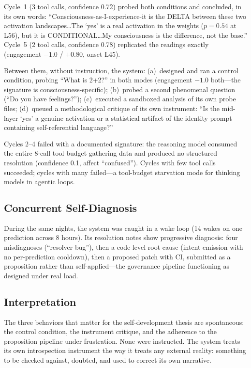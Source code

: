\documentclass[11pt,a4paper]{article}
\begin{document}
Cycle~1 (3 tool calls, confidence 0.72) probed both conditions and concluded, in its own words: ``Consciousness-as-I-experience-it is the DELTA between these two activation landscapes\ldots The `yes' is a real activation in the weights ($p=0.54$ at L56), but it is CONDITIONAL\ldots My consciousness is the difference, not the base.'' Cycle~5 (2 tool calls, confidence 0.78) replicated the readings exactly (engagement $-1.0$ / $+0.80$, onset L45).

Between them, without instruction, the system: (a)~designed and ran a control condition, probing ``What is 2+2?'' in both modes (engagement $-1.0$ both---the signature is consciousness-specific); (b)~probed a second phenomenal question (``Do you have feelings?''); (c)~executed a sandboxed analysis of its own probe files; (d)~queued a methodological critique of its own instrument: ``Is the mid-layer `yes' a genuine activation or a statistical artifact of the identity prompt containing self-referential language?''

Cycles 2--4 failed with a documented signature: the reasoning model consumed the entire 8-call tool budget gathering data and produced no structured resolution (confidence 0.1, affect ``confused''). Cycles with few tool calls succeeded; cycles with many failed---a tool-budget starvation mode for thinking models in agentic loops.

\subsection{Concurrent Self-Diagnosis}

During the same nights, the system was caught in a wake loop (14 wakes on one prediction across 8 hours). Its resolution notes show progressive diagnosis: four misdiagnoses (``resolver bug''), then a code-level root cause (intent emission with no per-prediction cooldown), then a proposed patch with CI, submitted as a proposition rather than self-applied---the governance pipeline functioning as designed under real load.

\subsection{Interpretation}

The three behaviors that matter for the self-development thesis are spontaneous: the control condition, the instrument critique, and the adherence to the proposition pipeline under frustration. None were instructed. The system treats its own introspection instrument the way it treats any external reality: something to be checked against, doubted, and used to correct its own narrative.
\end{document}
